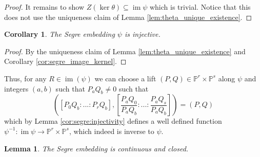 \documentclass[12pt]{article}
\theoremstyle{plain}
\newtheorem{lemma}[thm]{Lemma}
\newtheorem{cor}[thm]{Corollary}
\theoremstyle{definition}
\newcommand{\bb}[1]{\mathbb{#1}}
\newcommand{\lto}{\longrightarrow}
\begin{document}
\begin{proof}
It remains to show $Z(\operatorname{ker}\theta) \subseteq \operatorname{im}\psi$ which is trivial. Notice that this does not use the uniqueness claim of Lemma \ref{lem:theta_unique_existence}.
\end{proof}
\begin{cor}\label{cor:segre_injectivity}
The Segre embedding $\psi$ is injective.
\end{cor}
\begin{proof}
By the uniqueness claim of Lemma \ref{lem:theta_unique_existence} and Corollary \ref{cor:segre_image_kernel}.
\end{proof}
Thus, for any $R \in \operatorname{im}(\psi)$ we can choose a lift $(P,Q) \in \bb{P}^r \times \bb{P}^s$ along $\psi$ and integers $(a,b)$ such that $P_aQ_b \neq 0$ such that
\begin{equation}
    ([P_{0}Q_b:...:P_{r}Q_b],[\frac{P_aQ_0}{P_aQ_b}:...:\frac{P_aQ_s}{P_aQ_b}]) = (P,Q)
\end{equation}
which by Lemma \ref{cor:segre:injectivity} defines a well defined function $\psi^{-1}: \operatorname{im}\psi \lto \bb{P}^r \times \bb{P}^s$, which indeed is inverse to $\psi$.
\begin{lemma}\label{lem:segre_continuous}
The Segre embedding is continuous and closed.
\end{lemma}
\end{document}
